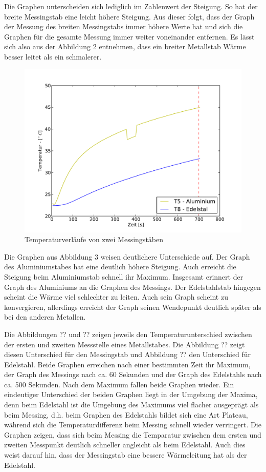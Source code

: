 \documentclass[11pt]{article}
\begin{document}
Die Graphen unterscheiden sich lediglich im Zahlenwert der Steigung. So hat der breite Messingstab eine leicht höhere Steigung. Aus dieser folgt, dass der Graph der Messung des breiten Messingstabs immer höhere Werte hat und sich die Graphen für die gesamte Messung immer weiter voneinander entfernen.
Es lässt sich also aus der Abbildung 2 entnehmen, dass ein breiter Metallstab Wärme besser leitet als ein schmalerer.
\begin{figure}[H]
\centering
\includegraphics[width = \textwidth]{Diagramme/Abb2.pdf}
\caption{Temperaturverläufe von zwei Messingstäben}
\label{T5T8}
\end{figure}
Die Graphen aus Abbildung 3 weisen deutlichere Unterschiede auf. Der Graph des Aluminiumstabes hat eine deutlich höhere Steigung. Auch erreicht die Steigung beim Aluminiumstab schnell ihr Maximum. Insgesamt erinnert der Graph des Aluminiums an die Graphen des Messings. Der Edelstahlstab hingegen scheint die Wärme viel schlechter zu leiten. Auch sein Graph scheint zu konvergieren, allerdings erreicht der Graph seinen Wendepunkt deutlich später als bei den anderen Metallen.

Die Abbildungen ?? und ?? zeigen jeweils den Temperaturunterschied zwischen der ersten und zweiten Messstelle eines Metallstabes. Die Abbildung ?? zeigt diesen Unterschied für den Messingstab und Abbildung ?? den Unterschied für Edelstahl.
Beide Graphen erreichen nach einer bestimmten Zeit ihr Maximum, der Graph des Messings nach ca. 60 Sekunden und der Graph des Edelstahls nach ca. 500 Sekunden. Nach dem Maximum fallen beide Graphen wieder. Ein eindeutiger Unterschied der beiden Graphen liegt in der Umgebung der Maxima, denn beim Edelstahl ist die Umgebung des Maximums viel flacher ausgeprägt als beim Messing, d.h. beim Graphen des Edelstahls bildet sich eine Art Plateau, während sich die Temperaturdifferenz beim Messing schnell wieder verringert. Die Graphen zeigen, dass sich beim Messing die Temparatur zwischen dem ersten und zweiten Messpunkt deutlich schneller angleicht als beim Edelstahl. Auch dies weist darauf hin, dass der Messingstab eine bessere Wärmeleitung hat als der Edelstahl.
\end{document}
